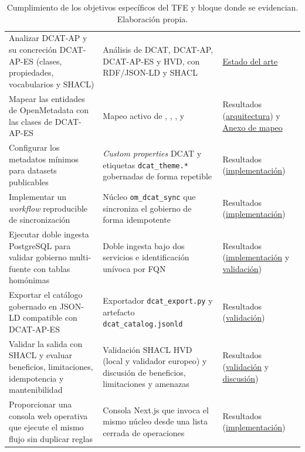 \begin{table}[ht]
\footnotesize
\centering
\renewcommand{\arraystretch}{1.2}
\begin{tabular}{|L{5.4cm}|L{4.0cm}|L{3.0cm}|}
\hline
{}
 &  &  \\ \hline
Analizar DCAT-AP y su concreción DCAT-AP-ES (clases, propiedades, vocabularios y SHACL) & Análisis de DCAT, DCAT-AP, DCAT-AP-ES y HVD, con RDF/JSON-LD y SHACL & \hyperref[cap:estado-arte]{Estado del arte} \\ \hline
Mapear las entidades de OpenMetadata con las clases de DCAT-AP-ES & Mapeo activo de , , ,  y  & Resultados (\hyperref[cap:arquitectura]{arquitectura}) y \hyperref[ap:mapeo-dcat]{Anexo de mapeo} \\ \hline
Configurar los metadatos mínimos para datasets publicables & \emph{Custom properties} DCAT y etiquetas \texttt{dcat\_theme.*} gobernadas de forma repetible & Resultados (\hyperref[cap:implementacion]{implementación}) \\ \hline
Implementar un \emph{workflow} reproducible de sincronización & Núcleo \texttt{om\_dcat\_sync} que sincroniza el gobierno de forma idempotente & Resultados (\hyperref[cap:implementacion]{implementación}) \\ \hline
Ejecutar doble ingesta PostgreSQL para validar gobierno multi-fuente con tablas homónimas & Doble ingesta bajo dos servicios e identificación unívoca por \ac{FQN} & Resultados (\hyperref[cap:implementacion]{implementación} y \hyperref[cap:validacion]{validación}) \\ \hline
Exportar el catálogo gobernado en JSON-LD compatible con DCAT-AP-ES & Exportador \texttt{dcat\_export.py} y artefacto \texttt{dcat\_catalog.jsonld} & Resultados (\hyperref[cap:validacion]{validación}) \\ \hline
Validar la salida con SHACL y evaluar beneficios, limitaciones, idempotencia y mantenibilidad & Validación SHACL HVD (local y validador europeo) y discusión de beneficios, limitaciones y amenazas & Resultados (\hyperref[cap:validacion]{validación} y \hyperref[sec:discusion-resultados]{discusión}) \\ \hline
Proporcionar una consola web operativa que ejecute el mismo flujo sin duplicar reglas & Consola Next.js que invoca el mismo núcleo desde una lista cerrada de operaciones & Resultados (\hyperref[cap:implementacion]{implementación}) \\ \hline
\end{tabular}
\caption{Cumplimiento de los objetivos específicos del TFE y bloque donde se evidencian. Elaboración propia.}
\label{tab:cumplimiento-objetivos}
\end{table}

